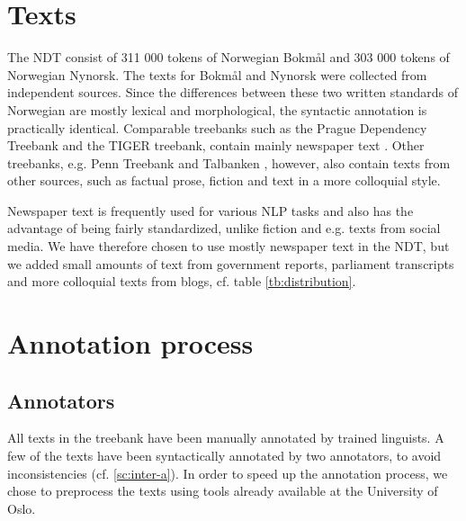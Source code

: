 \documentclass[10pt,a4paper]{article}
\begin{document}
\section{Texts}
The NDT consist of 311 000 tokens of Norwegian Bokmål and 303 000 tokens of Norwegian Nynorsk. The texts for Bokmål and Nynorsk were collected from independent sources. Since the differences between these two written standards of Norwegian are mostly lexical and morphological, the syntactic annotation is practically identical. Comparable treebanks such as the Prague Dependency Treebank and the TIGER treebank, contain mainly newspaper text \cite{Boh:Haj:Hla:2003,Bra:2004}. Other treebanks, e.g. Penn Treebank and Talbanken \cite{Mar:San:Mar:93,Niv:Nil:Hal:2006}, however, also contain texts from other sources, such as factual prose, fiction and text in a more colloquial style.

Newspaper text is frequently used for various NLP tasks and also has the advantage of being fairly standardized, unlike fiction and e.g. texts from social media. We have therefore chosen to use mostly newspaper text in the NDT, but we added small amounts of text from government reports, parliament transcripts and more colloquial texts from blogs, cf. table \ref{tb:distribution}.



\section{Annotation process}
\subsection{Annotators}
All texts in the treebank have been manually annotated by trained linguists. A
few of the texts have been syntactically annotated by two annotators, to
avoid inconsistencies (cf. \ref{sc:inter-a}). In order to speed up the annotation
process, we chose to preprocess the texts using tools already available at the
University of Oslo.
\end{document}
